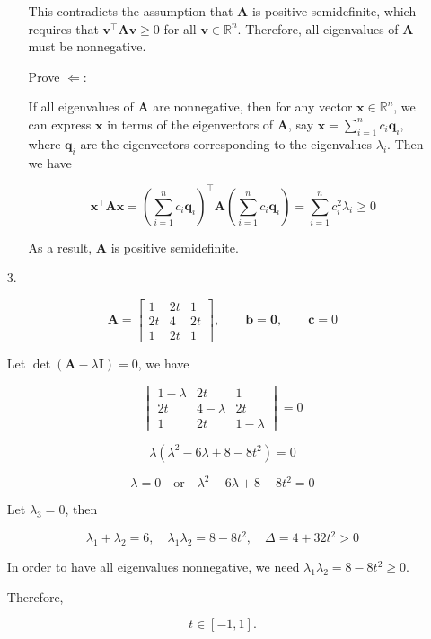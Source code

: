 \documentclass[10pt,a4paper]{article}
\begin{document}
\begin{enumerate}
\begin{enumerate}
        This contradicts the assumption that $\mathbf{A}$ is positive semidefinite, which requires that $\mathbf{v}^\top \mathbf{A} \mathbf{v} \geq 0$ for all $\mathbf{v} \in \mathbb{R}^n$. Therefore, all eigenvalues of $\mathbf{A}$ must be nonnegative.
        
        \item[] Prove $\Leftarrow$:
        
        If all eigenvalues of $\mathbf{A}$ are nonnegative, then for any vector $\mathbf{x} \in \mathbb{R}^n$, we can express $\mathbf{x}$ in terms of the eigenvectors of $\mathbf{A}$, say $\mathbf{x} = \sum_{i=1}^{n} c_i \mathbf{q}_i$, where $\mathbf{q}_i$ are the eigenvectors corresponding to the eigenvalues $\lambda_i$. Then we have

        $$
        \mathbf{x}^\top \mathbf{A} \mathbf{x} = \left(\sum_{i=1}^{n} c_i \mathbf{q}_i\right)^\top \mathbf{A} \left(\sum_{i=1}^{n} c_i \mathbf{q}_i\right) = \sum_{i=1}^{n} c_i^2 \lambda_i \geq 0
        $$
        
        As a result, $\mathbf{A}$ is positive semidefinite.
    \end{enumerate}

    \item[3. ]
    
    $$
    \mathbf{A}
    =
    \begin{bmatrix}
        1 & 2t & 1\\
        2t & 4 & 2t\\
        1 & 2t & 1
    \end{bmatrix}
    ,\qquad
    \mathbf{b} = \mathbf{0}
    ,\qquad
    \mathbf{c} = 0
    $$

    Let $\det(\mathbf{A} - \lambda \mathbf{I}) = 0$, we have

    $$
    \begin{vmatrix}
        1-\lambda & 2t & 1\\
        2t & 4-\lambda & 2t\\
        1 & 2t & 1-\lambda
    \end{vmatrix}
    =0
    $$

    $$
    \lambda(\lambda^2 - 6\lambda + 8 - 8t^2) = 0
    $$

    $$
    \lambda = 0 \quad \text{or} \quad \lambda^2 - 6\lambda + 8 - 8t^2 = 0
    $$

    Let $\lambda_3 = 0$, then

    $$
    \lambda_1 + \lambda_2 = 6, \quad \lambda_1 \lambda_2 = 8 - 8t^2, \quad \Delta = 4 + 32t^2 > 0
    $$

    In order to have all eigenvalues nonnegative, we need $\lambda_1 \lambda_2 = 8 - 8t^2 \geq 0$.
    
    Therefore,

    $$
    t \in [-1, 1].
    $$

\end{enumerate}
\end{document}
